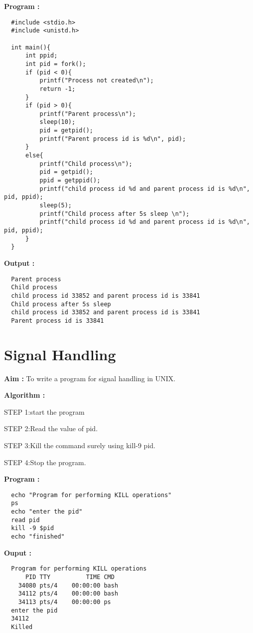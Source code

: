 \documentclass[journal,onecolumn]{IEEEtran}
\begin{document}
\textbf{Program : }
\begin{verbatim}
  #include <stdio.h>
  #include <unistd.h>
  
  int main(){
      int ppid;
      int pid = fork();
      if (pid < 0){
          printf("Process not created\n");
          return -1;
      }
      if (pid > 0){
          printf("Parent process\n");
          sleep(10);
          pid = getpid();
          printf("Parent process id is %d\n", pid);
      }
      else{
          printf("Child process\n");
          pid = getpid();
          ppid = getppid();
          printf("child process id %d and parent process id is %d\n", pid, ppid);
          sleep(5);
          printf("Child process after 5s sleep \n");
          printf("child process id %d and parent process id is %d\n", pid, ppid);
      }
  }
\end{verbatim}

\textbf{Output : }
\begin{verbatim}
  Parent process
  Child process
  child process id 33852 and parent process id is 33841
  Child process after 5s sleep 
  child process id 33852 and parent process id is 33841
  Parent process id is 33841
\end{verbatim}



\section{Signal Handling}
\textbf{Aim : } To write a program for signal handling in UNIX.

\textbf{Algorithm : }
\begin{list}{}{}
  \item STEP 1:start the program
  \item STEP 2:Read the value of
  pid.
  \item STEP 3:Kill the command surely using kill-9 pid.
  \item STEP 4:Stop the program.
\end{list}


\textbf{Program : }
\begin{verbatim}
  echo "Program for performing KILL operations"
  ps
  echo "enter the pid"
  read pid
  kill -9 $pid
  echo "finished"  
\end{verbatim}

\textbf{Ouput : }
\begin{verbatim}
  Program for performing KILL operations
      PID TTY          TIME CMD
    34080 pts/4    00:00:00 bash
    34112 pts/4    00:00:00 bash
    34113 pts/4    00:00:00 ps
  enter the pid
  34112
  Killed
\end{verbatim}
\end{document}
